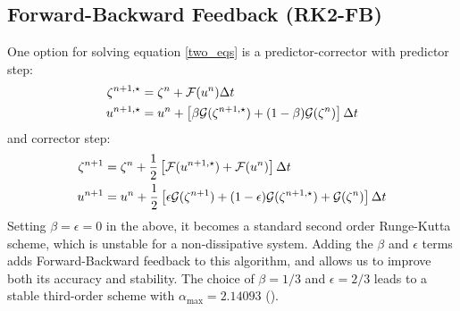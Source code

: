 \subsection{Forward-Backward Feedback (RK2-FB)}
One option for solving equation \ref{two_eqs} is a predictor-corrector
with predictor step:
\begin{equation}\begin{split}
   \zeta^{n+1,\star} &= \zeta^n + {\cal F}(u^n)\Delta t \\
   u^{n+1,\star} &= u^n + \left[\beta {\cal G}(\zeta^{n+1,\star}) +
   (1-\beta) {\cal G}(\zeta^n)\right] \Delta t
\end{split}\end{equation}
and corrector step:
\begin{equation}\begin{split}
   \zeta^{n+1} &= \zeta^n + \frac{1}{2} \left[{\cal F}(u^{n+1,\star}) +
   {\cal F}(u^n) \right] \Delta t \\
   u^{n+1} &= u^n + \frac{1}{2} \left[\epsilon {\cal G}(\zeta^{n+1}) +
   (1-\epsilon){\cal G}(\zeta^{n+1,\star}) + {\cal G}(\zeta^n)
   \right] \Delta t
\end{split}\end{equation}
Setting $\beta = \epsilon = 0$ in the above, it becomes a standard
second order Runge-Kutta scheme, which is unstable for a
non-dissipative system. Adding the $\beta$ and $\epsilon$ terms adds
Forward-Backward feedback to this algorithm, and allows us to
improve both its accuracy and stability. The choice of $\beta = 1/3$
and $\epsilon = 2/3$ leads to a stable third-order scheme with
$\alpha_{\max} = 2.14093$ (\cite{SS2008b}).


